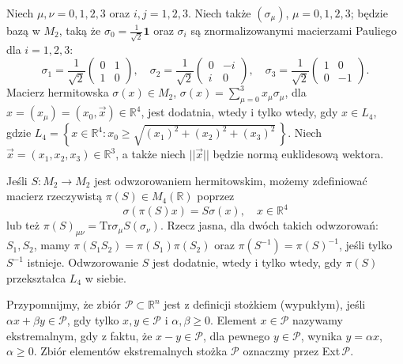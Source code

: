 Niech $\mu,\nu = 0,1,2,3$ oraz $i,j = 1,2,3$.
Niech także $(\sigma_{\mu})$, $\mu = 0, 1, 2, 3$;
będzie bazą w  $M_{2}$, taką że
$\sigma_{0} = \tfrac{1}{\sqrt{2}}  \mathbf{1}$ oraz
$\sigma_{i}$
są znormalizowanymi macierzami Pauliego dla $i=1,2,3$:
\begin{equation}
 \sigma_{1} = \frac{1}{\sqrt{2}} \begin{pmatrix}
        0 & 1 \\ 1 & 0
           \end{pmatrix},
\quad
\sigma_{2} = \frac{1}{\sqrt{2}}  \begin{pmatrix}
        0 & -i \\ i & 0
           \end{pmatrix},
\quad
\sigma_{3} = \frac{1}{\sqrt{2}}  \begin{pmatrix}
        1 & 0 \\ 0 & -1
           \end{pmatrix}.
\end{equation}
Macierz hermitowska $\sigma(x) \in M_{2}$,
$\sigma(x) = \sum_{\mu =0}^{3} x_{\mu} \sigma_{\mu}$,
dla $x = (x_{\mu}) = (x_{0}, \vec{x}) \in \mathbb{R}^{4}$,
jest dodatnia, wtedy i tylko wtedy, gdy
$x \in L_{4}$,
gdzie
$ L_{4} = \left \{
            x \in \mathbb{R}^{4} :
            x_{0} \geq \sqrt{(x_{1})^{2} + (x_{2})^{2} + (x_{3})^{2}} \,
        \right \}$.
Niech $\vec{x} = (x_{1}, x_{2}, x_{3}) \in \mathbb{R}^{3}$,
a także niech $||\vec{x}||$ będzie normą euklidesową wektora.

Jeśli $S: M_{2} \rightarrow M_{2}$ jest odwzorowaniem hermitowskim,
możemy zdefiniować macierz rzeczywistą $\pi(S) \in M_{4}(\mathbb{R})$ poprzez
\begin{equation}
\label{def:PiofSiso}
  \sigma(\pi(S) x) = S \sigma(x), \quad x \in \mathbb{R}^{4}
\end{equation}
lub też $\pi(S)_{\mu \nu} = \text{Tr} \sigma_{\mu} S(\sigma_{\nu})$.
Rzecz jasna, dla dwóch takich odwzorowań: $S_{1}, S_{2}$, mamy
$\pi(S_{1} S_{2}) = \pi(S_{1}) \pi(S_{2})$
oraz $\pi(S^{-1}) = \pi(S)^{-1}$, jeśli tylko $S^{-1}$ istnieje.
Odwzorowanie $S$ jest dodatnie, wtedy i tylko wtedy, gdy
$\pi(S)$ przekształca $L_{4}$ w siebie.

Przypomnijmy, że zbiór $\mathcal{P} \subset \mathbb{R}^{n}$
jest z definicji stożkiem (wypukłym), jeśli
$\alpha x + \beta y \in \mathcal{P}$,
gdy tylko $x, y \in \mathcal{P}$ i $\alpha, \beta \geq 0$.
Element $x \in \mathcal{P}$ nazywamy ekstremalnym, gdy
z faktu, że $x - y \in \mathcal{P}$,
dla pewnego $y \in \mathcal{P}$,
wynika $y = \alpha x$, $\alpha \geq 0$.
Zbiór elementów ekstremalnych stożka $\mathcal{P}$ oznaczmy przez
Ext\,$\mathcal{P}$.

